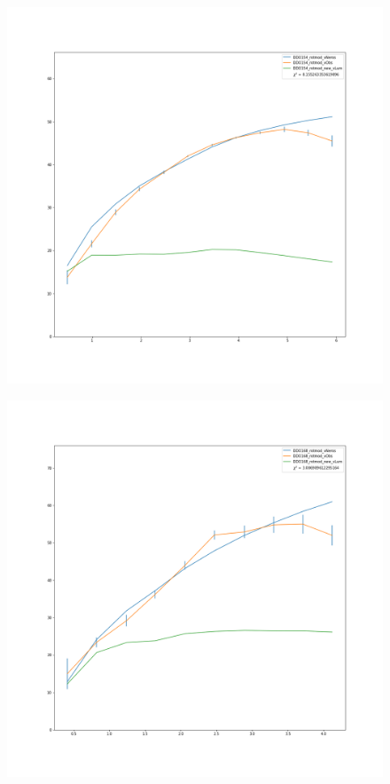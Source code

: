 \documentclass[reprint,%
 amsmath,amssymb,
 aps,
]{revtex4-1}
\begin{document}
\begin{figure}
\begin{minipage}{.5\textwidth}
  \label{fig:test1}
\end{minipage}%
\begin{minipage}{.5\textwidth}
  \centering
  \includegraphics[width=.4\linewidth]{figures/DDO154_rotmod_XueSofue.png}
  \label{fig:test2}
\end{minipage}
\begin{minipage}{.5\textwidth}
  \centering
  \includegraphics[width=.8\linewidth]{figures/DDO168_rotmod_XueSofue.png}
  \label{fig:test1}
\end{minipage}%
\begin{minipage}{.5\textwidth}
  \centering

\end{minipage}
\end{figure}
\end{document}
